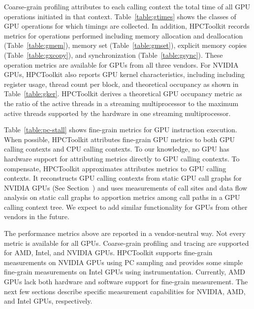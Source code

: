 Coarse-grain profiling attributes to each calling context the total time of all GPU operations initiated in that context. Table~\ref{table:gtimes} shows the classes of GPU operations for which timings are collected. In addition, HPCToolkit records metrics for operations performed including memory allocation and deallocation (Table~\ref{table:gmem}), memory set (Table~\ref{table:gmset}), explicit memory copies (Table~\ref{table:gxcopy}), and synchronization (Table~\ref{table:gsync}). These operation metrics are available for GPUs from all three vendors. 
For NVIDIA GPUs, HPCToolkit also reports GPU kernel characteristics, including including register usage, thread count per block, and theoretical occupancy as shown in Table~\ref{table:gker}. HPCToolkit derives a theoretical GPU occupancy metric as the ratio of the active threads in a streaming multiprocessor to the maximum active threads supported by the hardware in one streaming multiprocessor.

Table~\ref{table:pc-stall} shows fine-grain metrics for GPU instruction execution.
When possible, HPCToolkit attributes fine-grain GPU metrics to both GPU calling contexts and CPU calling contexts.
To our knowledge, no GPU has hardware support for attributing metrics directly to GPU calling contexts.
To compensate, HPCToolkit approximates attributes metrics to GPU calling contexts. It reconstructs GPU calling contexts from static GPU call graphs for 
NVIDIA GPUs (See Section~\label{nvidia-cct}) and uses measurements of call sites and data flow analysis on static call graphs to apportion metrics among call paths in a GPU calling context tree.
We expect to add similar functionality for GPUs from other vendors in the future.

The performance metrics above are reported in a vendor-neutral way. Not every metric is available for all GPUs.
Coarse-grain profiling and tracing are supported for AMD, Intel, and NVIDIA GPUs. HPCToolkit supports fine-grain measurements on NVIDIA GPUs using PC sampling and provides some simple fine-grain measurements on Intel GPUs using instrumentation. 
Currently, AMD GPUs lack both hardware and software support for fine-grain measurement.  The next few sections describe specific measurement capabilities for NVIDIA, AMD, and Intel GPUs, respectively.


